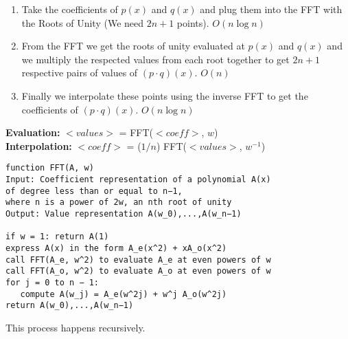 \documentclass[3pt,landscape]{article}
\begin{document}
\begin{multicols}{3}
\begin{enumerate}
  \item Take the coefficients of $p(x)$ and $q(x)$ and plug them into the FFT with the Roots of Unity (We need $2n+1$ points). \(O(n\log{n})\)
  \item From the FFT we get the roots of unity evaluated at $p(x)$ and $q(x)$ and we multiply the respected values from each root together to get $2n+1$ respective pairs of values of $(p \cdot q)(x)$. \(O(n)\)
  \item Finally we interpolate these points using the inverse FFT to get the coefficients of $(p \cdot q)(x)$. \(O(n\log{n})\)
\end{enumerate}
\textbf{Evaluation: }$<values>$ = FFT($<coeff>$, $w$)\\
\textbf{Interpolation: }$<coeff>$ = ($1/n$) FFT($<values>$, $w^{-1}$)\\

\begin{verbatim}
function FFT(A, w)
Input: Coefficient representation of a polynomial A(x)
of degree less than or equal to n−1, 
where n is a power of 2w, an nth root of unity
Output: Value representation A(w_0),...,A(w_n−1)

if w = 1: return A(1)
express A(x) in the form A_e(x^2) + xA_o(x^2)
call FFT(A_e, w^2) to evaluate A_e at even powers of w 
call FFT(A_o, w^2) to evaluate A_o at even powers of w 
for j = 0 to n − 1:
   compute A(w_j) = A_e(w^2j) + w^j A_o(w^2j) 
return A(w_0),...,A(w_n−1)
\end{verbatim}

\iffalse
\textbf{Roots of Unity: }\\
complex \(n^{th}\) roots of unity are given by \(e^{\frac{2 \pi i}{n}}\)
The Vandermonde Matrix,
\[M_{n}(\omega) =
    \begin{bmatrix}
        1 & 1 & 1 & \cdots & 1\\
        1 & \omega & \omega^{2} & \cdots & \omega^{n-1}\\
        1 & \omega^{2} & \omega^{4} & \cdots & \omega^{2(n-1)}\\
        \vdots & \vdots & \vdots & \ddots & \vdots\\
        1 & \omega^{j} & \omega^{2j} & \cdots & \omega^{(n-1)j}\\
        \vdots & \vdots & \vdots & \ddots & \vdots\\
        1 & \omega^{(n-1)} & \omega^{2(n-1)} & \cdots & \omega^{(n-1)(n-1)}
\end{bmatrix}\]
\fi
This process happens recursively. 


\end{multicols}
\end{document}
